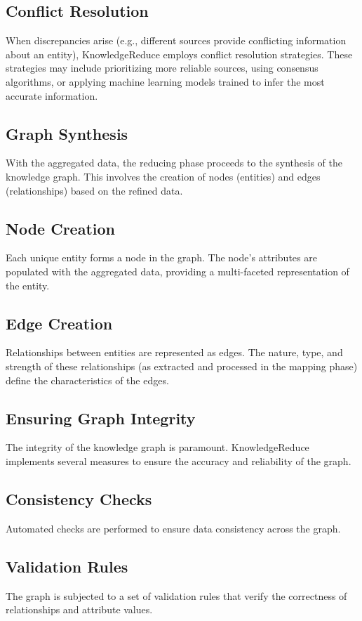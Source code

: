 \documentclass{article}
\begin{document}
\subsection{Conflict Resolution}
When discrepancies arise (e.g., different sources provide conflicting information about an entity), KnowledgeReduce employs conflict resolution strategies.
These strategies may include prioritizing more reliable sources, using consensus algorithms, or applying machine learning models trained to infer the most accurate information.
\subsection{Graph Synthesis}
With the aggregated data, the reducing phase proceeds to the synthesis of the knowledge graph. This involves the creation of nodes (entities) and edges (relationships) based on the refined data.

\subsection{Node Creation}
Each unique entity forms a node in the graph. The node's attributes are populated with the aggregated data, providing a multi-faceted representation of the entity.
\subsection{Edge Creation}
Relationships between entities are represented as edges. The nature, type, and strength of these relationships (as extracted and processed in the mapping phase) define the characteristics of the edges.
\subsection{Ensuring Graph Integrity}
The integrity of the knowledge graph is paramount. KnowledgeReduce implements several measures to ensure the accuracy and reliability of the graph.

\subsection{Consistency Checks} 
Automated checks are performed to ensure data consistency across the graph.
\subsection{Validation Rules}
The graph is subjected to a set of validation rules that verify the correctness of relationships and attribute values.
\end{document}
